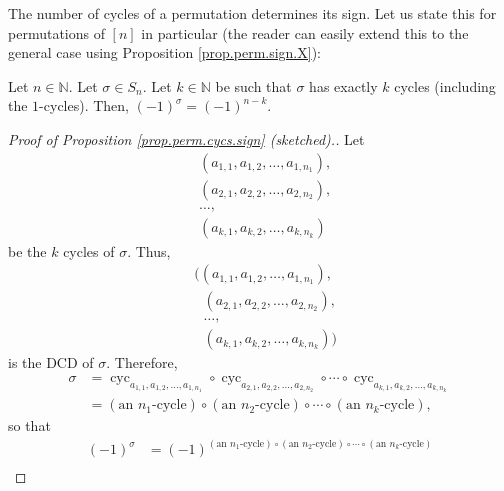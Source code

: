 The number of cycles of a permutation determines its sign. Let us state this
for permutations of $\left[  n\right]  $ in particular (the reader can easily
extend this to the general case using Proposition \ref{prop.perm.sign.X}):

\begin{proposition}
\label{prop.perm.cycs.sign}Let $n\in\mathbb{N}$. Let $\sigma\in S_{n}$. Let
$k\in\mathbb{N}$ be such that $\sigma$ has exactly $k$ cycles (including the
$1$-cycles). Then, $\left(  -1\right)  ^{\sigma}=\left(  -1\right)  ^{n-k}$.
\end{proposition}

\begin{proof}
[Proof of Proposition \ref{prop.perm.cycs.sign} (sketched).]Let
\begin{align*}
&  \left(  a_{1,1},a_{1,2},\ldots,a_{1,n_{1}}\right)  ,\\
&  \left(  a_{2,1},a_{2,2},\ldots,a_{2,n_{2}}\right)  ,\\
&  \ldots,\\
&  \left(  a_{k,1},a_{k,2},\ldots,a_{k,n_{k}}\right)
\end{align*}
be the $k$ cycles of $\sigma$. Thus,
\begin{align}
&  \Big(\left(  a_{1,1},a_{1,2},\ldots,a_{1,n_{1}}\right)  ,\nonumber\\
&  \ \ \ \left(  a_{2,1},a_{2,2},\ldots,a_{2,n_{2}}\right)  ,\nonumber\\
&  \ \ \ \ldots,\nonumber\\
&  \ \ \ \left(  a_{k,1},a_{k,2},\ldots,a_{k,n_{k}}\right)
\Big) \label{pf.prop.perm.cycs.sign.3}%
\end{align}
is the DCD of $\sigma$. Therefore,
\begin{align*}
\sigma &  =\operatorname*{cyc}\nolimits_{a_{1,1},a_{1,2},\ldots,a_{1,n_{1}}%
}\circ\operatorname*{cyc}\nolimits_{a_{2,1},a_{2,2},\ldots,a_{2,n_{2}}}%
\circ\cdots\circ\operatorname*{cyc}\nolimits_{a_{k,1},a_{k,2},\ldots
,a_{k,n_{k}}}\\
&  =\left(  \text{an }n_{1}\text{-cycle}\right)  \circ\left(  \text{an }%
n_{2}\text{-cycle}\right)  \circ\cdots\circ\left(  \text{an }n_{k}%
\text{-cycle}\right)  ,
\end{align*}
so that%
\begin{align}
\left(  -1\right)  ^{\sigma}  &  =\left(  -1\right)  ^{\left(  \text{an }%
n_{1}\text{-cycle}\right)  \circ\left(  \text{an }n_{2}\text{-cycle}\right)
\circ\cdots\circ\left(  \text{an }n_{k}\text{-cycle}\right)  }\nonumber\\

\end{align}
\end{proof}
